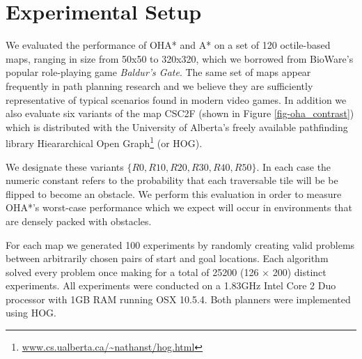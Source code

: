 \section{Experimental Setup}
We evaluated the performance of OHA* and A* on a set of 120 octile-based maps, ranging in size from 50x50 
to 320x320, which we borrowed from BioWare's popular role-playing game \emph{Baldur's Gate}. 
The same set of maps appear frequently in path planning research 
\cite{botea04,bjornsson05,bjornsson06,harabor08} and we believe they are sufficiently representative 
of typical scenarios found in modern video games.
In addition we also evaluate six variants of the map CSC2F (shown in Figure \ref{fig-oha_contrast}) which is distributed with the University of Alberta's freely available pathfinding library 
Hieararchical Open Graph\footnote{\url{www.cs.ualberta.ca/~nathanst/hog.html}} (or HOG).

We designate these variants $\lbrace R0, R10, R20, R30, R40, R50 \rbrace$. 
In each case the numeric constant refers to the probability that each traversable tile will be be flipped to 
become an obstacle.
We perform this evaluation in order to measure OHA*'s worst-case performance which we expect will occur in 
environments that are densely packed with obstacles.
\par
For each map we generated 100 experiments by randomly creating valid problems between arbitrarily chosen 
pairs of start and goal locations.
Each algorithm solved every problem once making for a total of 25200 (126 $\times$ 200) distinct experiments.
All experiments were conducted on a 1.83GHz Intel Core 2 Duo processor with 1GB RAM running OSX 10.5.4.
Both planners were implemented using HOG. 
